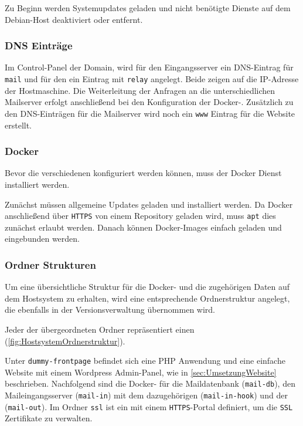 \documentclass[a4paper,11pt,singlespacing]{article}
\begin{document}
		Zu Beginn werden Systemupdates geladen und nicht benötigte Dienste auf dem Debian-Host deaktiviert oder entfernt.
		
		\subsubsection{DNS Einträge}\label{sec:DNSEinträge}
			Im Control-Panel der Domain, wird für den Eingangsserver ein DNS-Eintrag für \texttt{mail} und für den  ein Eintrag mit \texttt{relay} angelegt. Beide zeigen auf die IP-Adresse der Hostmaschine. Die Weiterleitung der Anfragen an die unterschiedlichen Mailserver erfolgt anschließend bei den Konfiguration der Docker-.
			Zusätzlich zu den DNS-Einträgen für die Mailserver wird noch ein \texttt{www} Eintrag für die Website erstellt.

		\subsubsection{Docker}\label{sec:DockerAufsetzen}
			Bevor die verschiedenen  konfiguriert werden können, muss der Docker Dienst installiert werden.
			
			Zunächst müssen allgemeine Updates geladen und installiert werden. Da Docker anschließend über \texttt{HTTPS} von einem Repository geladen wird, muss \texttt{apt} dies zunächst erlaubt werden. \cite{dockerInstall} Danach können Docker-Images einfach geladen und eingebunden werden.

		\subsubsection{Ordner Strukturen}\label{OrdnerStrukturen}
	
			Um eine übersichtliche Struktur für die Docker- und die zugehörigen Daten auf dem Hostsystem zu erhalten, wird eine entsprechende Ordnerstruktur angelegt, die ebenfalls in der Versionsverwaltung übernommen wird.
			
			Jeder der übergeordneten Ordner repräsentiert einen  (\autoref{fig:HostsystemOrdnerstruktur}).
			
			Unter \texttt{dummy-frontpage} befindet sich eine PHP Anwendung und eine einfache Website mit einem Wordpress Admin-Panel, wie in \autoref{sec:UmsetzungWebsite} beschrieben. 
			Nachfolgend sind die Docker- für die Maildatenbank (\texttt{mail-db}), den Maileingangsserver (\texttt{mail-in}) mit dem dazugehörigen  (\texttt{mail-in-hook}) und der  (\texttt{mail-out}). Im Ordner \texttt{ssl} ist ein  mit einem \texttt{HTTPS}-Portal definiert, um die \texttt{SSL} Zertifikate zu verwalten.
			
\end{document}
